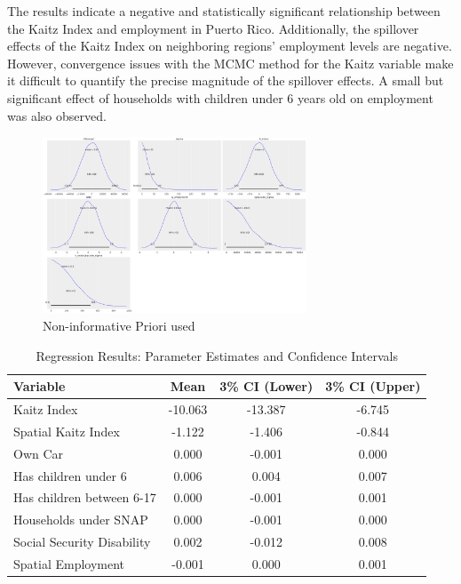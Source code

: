 \documentclass[12pt]{article}
\begin{document}
The results indicate a negative and statistically significant relationship between the Kaitz
Index and employment in Puerto Rico. Additionally, the spillover effects of the Kaitz
Index on neighboring regions’ employment levels are negative. However, convergence issues
with the MCMC method for the Kaitz variable make it difficult to quantify the precise
magnitude of the spillover effects. A small but significant effect of households
with children under 6 years old on employment was also observed.

\begin{figure}[H]
	\centering
	\includegraphics[width=0.7\textwidth]{priori.png}
	\caption{Non-informative Priori used}
\end{figure}

\begin{table}[H]
	\centering
	\begin{tabular}{lccc}
		\toprule
		\textbf{Variable}          & \textbf{Mean} & \textbf{3\% CI (Lower)} & \textbf{3\% CI (Upper)} \\
		\midrule
		Kaitz Index                & -10.063       & -13.387                 & -6.745                  \\
		Spatial Kaitz Index        & -1.122        & -1.406                  & -0.844                  \\
		Own Car                    & 0.000         & -0.001                  & 0.000                   \\
		Has children under 6       & 0.006         & 0.004                   & 0.007                   \\
		Has children between 6-17  & 0.000         & -0.001                  & 0.001                   \\
		Households under SNAP      & 0.000         & -0.001                  & 0.000                   \\
		Social Security Disability & 0.002         & -0.012                  & 0.008                   \\
		Spatial Employment         & -0.001        & 0.000                   & 0.001                   \\
		\bottomrule
	\end{tabular}
	\caption{Regression Results: Parameter Estimates and Confidence Intervals}
\end{table}
\end{document}
